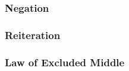 \vspace{-10pt}
\hrulefill
\vspace{-10pt}
\begin{multicols}{2}
\subsubsection*{Negation}
\begin{pf}
\end{pf}

\vfill\null
\columnbreak

\begin{pf}
\end{pf}


\end{multicols} %

\vspace{-10pt}
\hrulefill
\vspace{-10pt}
\begin{multicols}{2}
\subsubsection*{Reiteration}

\begin{pf}
	 
\end{pf}

\subsubsection*{Law of Excluded Middle}
\begin{pf}
	\LEM
\end{pf}
\end{multicols}  %


